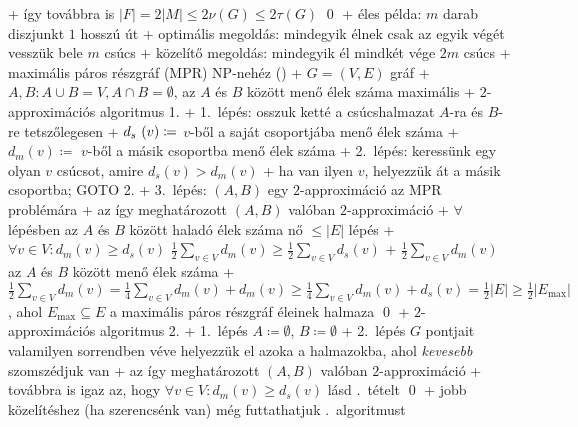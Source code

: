       + így továbbra is $\lvert F \rvert = 2 \lvert M \rvert \le 2
        \nu(G) \le 2 \tau(G)$ \qed
  + éles példa: $m$ darab diszjunkt $1$ hosszú út
    + optimális megoldás: mindegyik élnek csak az egyik végét vesszük
      bele \RA $m$ csúcs
    + közelítő megoldás: mindegyik él mindkét vége \RA $2m$ csúcs
+ \prob maximális páros részgráf (MPR) \RA NP-nehéz (\noproof)
    + \DataIn $G = (V, E)$ gráf
    + \DataOut $A, B: A \cup B = V, A \cap B = \emptyset$, az $A$ és $B$ között
      menő élek száma maximális
    + \alg \label{alg:kozelito:multi:paros1}$2$-approximációs algoritmus 1.
      + 1.~lépés: osszuk ketté a csúcshalmazat $A$-ra és $B$-re
        tetszőlegesen
      + $d_{\mathrlap{s}\phantom{m}}(v) \coloneqq$ $v$-ből a saját
        csoportjába menő élek száma
      + $d_m(v) \coloneqq$ $v$-ből a másik csoportba menő élek száma
      + 2.~lépés: keressünk egy olyan $v$ csúcsot, amire $d_s(v) >
        d_m(v)$
        + ha van ilyen $v$, helyezzük át a másik csoportba; GOTO 2.
      + 3.~lépés: $(A, B)$ egy $2$-approximáció az MPR problémára
      + \thm \label{thm:kozelito:multi:paros1}az így meghatározott $(A, B)$ valóban $2$-approximáció
        + \proof $\forall$ lépésben az $A$ és $B$ között haladó élek
          száma nő \RA $\le \lvert E \rvert$ lépés
        + $\forall v \in V : d_m(v) \ge d_s(v)$ \RA $\frac{1}{2}
          \sum_{v \in V} d_m(v) \ge \frac{1}{2} \sum_{v \in V} d_s(v)$
        + $\frac{1}{2} \sum_{v \in V} d_m(v)$ az $A$ és $B$ között
          menő élek száma
        + $\frac{1}{2} \sum_{v \in V} d_m(v) = \frac{1}{4} \sum_{v
          \in V} d_m(v) + d_m(v) \ge \frac{1}{4} \sum_{v \in V}
          d_m(v) + d_s(v) = \frac{1}{2} \lvert E \rvert \ge
          \frac{1}{2} \lvert E_{\max} \rvert$,
          ahol $E_{\max} \subseteq E$ a maximális páros részgráf
          éleinek halmaza \qed
    + \alg $2$-approximációs algoritmus 2.
      + 1.~lépés $A \coloneqq \emptyset$, $B \coloneqq \emptyset$
      + 2.~lépés $G$ pontjait valamilyen sorrendben véve helyezzük el
        azoka a halmazokba, ahol \emph{kevesebb} szomszédjuk van
      + \thm az így meghatározott $(A, B)$ valóban $2$-approximáció
        + továbbra is igaz az, hogy $\forall v \in V : d_m(v) \ge
        d_s(v)$ \RA lásd .~tételt \qed
      + jobb közelítéshez (ha szerencsénk van) még futtathatjuk
        .~algoritmust
